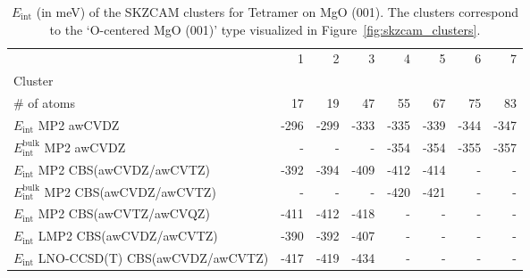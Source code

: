 \begin{table}
\caption{\label{tab:system_eint_mgo_h2o_tetramer}$E_\textrm{int}$ (in meV) of the SKZCAM clusters for Tetramer  on MgO (001). The clusters correspond to the `O-centered MgO (001)' type visualized in Figure~\ref{fig:skzcam_clusters}.}
\begin{adjustbox}{center,max width=1.4\textwidth}
\begin{tabular}{lrrrrrrr}
\toprule
 & 1 & 2 & 3 & 4 & 5 & 6 & 7 \\ 
Cluster &  &  &  &  &  &  &  \\
\midrule
\# of atoms & 17 & 19 & 47 & 55 & 67 & 75 & 83 \\
$E_\textrm{int}$ MP2 awCVDZ & -296 & -299 & -333 & -335 & -339 & -344 & -347 \\
$E_\textrm{int}^\textrm{bulk}$ MP2 awCVDZ & - & - & - & -354 & -354 & -355 & -357 \\
$E_\textrm{int}$ MP2 CBS(awCVDZ/awCVTZ) & -392 & -394 & -409 & -412 & -414 & - & - \\
$E_\textrm{int}^\textrm{bulk}$ MP2 CBS(awCVDZ/awCVTZ) & - & - & - & -420 & -421 & - & - \\
$E_\textrm{int}$ MP2 CBS(awCVTZ/awCVQZ) & -411 & -412 & -418 & - & - & - & - \\
$E_\textrm{int}$ LMP2 CBS(awCVDZ/awCVTZ) & -390 & -392 & -407 & - & - & - & - \\
$E_\textrm{int}$ LNO-CCSD(T) CBS(awCVDZ/awCVTZ) & -417 & -419 & -434 & - & - & - & - \\
\bottomrule
\end{tabular}
\end{adjustbox}
\end{table}


